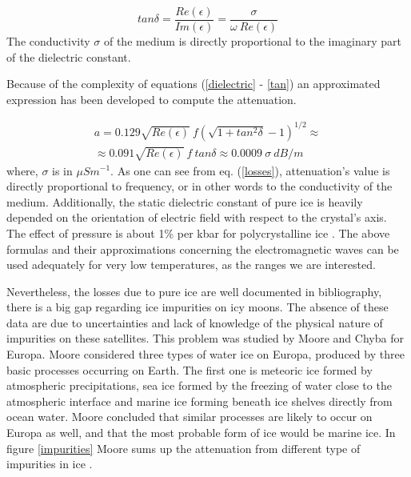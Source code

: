 \documentclass{book}
\begin{document}
\begin{equation}
    tan \delta=\frac{Re(\epsilon)}{Im(\epsilon)}=\frac{\sigma}{\omega\ Re(\epsilon)}
    \label{tan}
\end{equation}
The conductivity $\sigma$ of the medium is directly proportional to the imaginary part of the dielectric constant.

Because of the complexity of equations (\ref{dielectric} - \ref{tan}) an approximated expression has been developed to compute the attenuation.

\begin{multline}
    a=0.129 \sqrt{Re(\epsilon)}\ f (\sqrt{1+tan^2 \delta}-1)^{1/2} \approx \\
    \approx 0.091 \sqrt{Re(\epsilon)}\ f\ tan \delta \approx 0.0009\ \sigma\ dB/m
    \label{losses}
\end{multline}
where, $\sigma$ is in $\mu S m^{-1}$. As one can see from eq. (\ref{losses}), attenuation's value is directly proportional to frequency, or in other words to the conductivity of the medium. Additionally, the static dielectric constant of pure ice is heavily depended on the orientation of electric field with respect to the crystal's axis. The effect of pressure is about 1\% per kbar for polycrystalline ice \cite{Kofman_2010}. The above formulas and their approximations concerning the electromagnetic waves can be used adequately for very low temperatures, as the ranges we are interested.

Nevertheless, the losses due to pure ice are well documented in bibliography, there is a big gap regarding ice impurities on icy moons. The absence of these data are due to uncertainties and lack of knowledge of the physical nature of impurities on these satellites. This problem was studied by  Moore \cite{Moore_2000} and Chyba \cite{Chyba_1998} for Europa. Moore considered three types of water ice on Europa, produced by three basic processes occurring on Earth. The first one is meteoric ice formed by atmospheric precipitations, sea ice formed by the freezing of water close to the atmospheric interface and marine ice forming beneath ice shelves directly from ocean water. Moore concluded that similar processes are likely to occur on Europa as well, and that the most probable form of ice would be marine ice. In figure \ref{impurities} Moore sums up the attenuation from different type of impurities in ice \cite{Moore_2000}.
\end{document}
